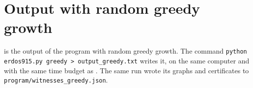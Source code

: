 \section{Output with random greedy growth}\label{sec:output-greedy}
 is the output of the program with random greedy growth.
The command \texttt{python erdos915.py greedy > output\_greedy.txt} writes it, on the same computer and with the same time budget as . The same run wrote its graphs and certificates to \texttt{program/witnesses\_greedy.json}.

\renewcommand{\outputfile}{program/output_greedy.txt}
{}
